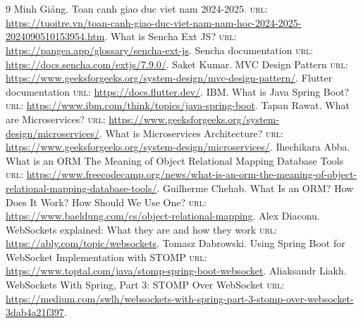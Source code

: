 \renewcommand{\refname}{} %
\makeatletter
\patchcmd{\thebibliography}
  {\section*{\refname}}  %
  {}                     %
  {}{}
\makeatother
 
\begin{thebibliography}{9}
Minh Giảng. Toan canh giao duc viet nam 2024-2025. \textsc{url}: \url{https://tuoitre.vn/toan-canh-giao-duc-viet-nam-nam-hoc-2024-2025-2024090510153954.htm}.
What is Sencha Ext JS? \textsc{url}: \url{https://pangea.app/glossary/sencha-ext-js}.
Sencha documentation \textsc{url}: \url{https://docs.sencha.com/extjs/7.9.0/}.
Saket Kumar. MVC Design Pattern \textsc{url}: \url{https://www.geeksforgeeks.org/system-design/mvc-design-pattern/}.
Flutter documentation \textsc{url}: \url{https://docs.flutter.dev/}.
IBM. What is Java Spring Boot? \textsc{url}: \url{https://www.ibm.com/think/topics/java-spring-boot}.
Tapan Rawat. What are Microservices? \textsc{url}: \url{https://www.geeksforgeeks.org/system-design/microservices/}.
What is Microservices Architecture? \textsc{url}: \url{https://www.geeksforgeeks.org/system-design/microservices/}.
Ihechikara Abba. What is an ORM \- The Meaning of Object Relational Mapping Database Tools \textsc{url}: \url{https://www.freecodecamp.org/news/what-is-an-orm-the-meaning-of-object-relational-mapping-database-tools/}.
Guilherme Chehab. What Is an ORM? How Does It Work? How Should We Use One? \textsc{url}: \url{https://www.baeldung.com/cs/object-relational-mapping}.
Alex Diaconu. WebSockets explained: What they are and how they work \textsc{url}: \url{https://ably.com/topic/websockets}.
Tomasz Dabrowski. Using Spring Boot for WebSocket Implementation with STOMP \textsc{url}: \url{https://www.toptal.com/java/stomp-spring-boot-websocket}.
Aliaksandr Liakh. WebSockets With Spring, Part 3: STOMP Over WebSocket \textsc{url}: \url{https://medium.com/swlh/websockets-with-spring-part-3-stomp-over-websocket-3dab4a21f397}.
\end{thebibliography}